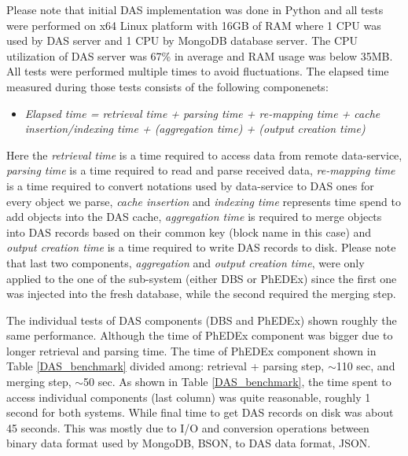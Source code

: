 \documentclass[1p,times]{elsarticle}
\begin{document}
Please note that initial DAS implementation was done in Python 
and all tests were performed on x64 Linux platform with 16GB of RAM where
1 CPU was used by DAS server and 1 CPU by MongoDB database server. The CPU utilization
of DAS server was 67\% in average and RAM usage was below 35MB. 
All tests were performed multiple times to avoid fluctuations. 
The elapsed time measured during those tests consists of the 
following componenets:
\begin{itemize}
\item[]
{\it
Elapsed time = retrieval time + parsing time + re-mapping time 
        + cache insertion/indexing time 
        + (aggregation time) + (output creation time)
}
\end{itemize}
Here the {\it retrieval time} is a time required to access data from remote data-service,
{\it parsing time} is a time required to read and parse received data, {\it re-mapping time}
is a time required to convert notations used by data-service to DAS ones for every object
we parse, {\it cache insertion} and {\it indexing time} represents time spend to add objects into
the DAS cache, {\it aggregation time} is required to merge objects into DAS records based
on their common key (block name in this case) and {\it output creation time}
is a time required to write DAS records to disk. Please note that last two
components, {\it aggregation} and {\it output creation time}, were only applied to
the one of the sub-system (either DBS or PhEDEx) since the first one was injected into
the fresh database, while the second required the merging step.

%

The individual tests of DAS components (DBS and PhEDEx) shown roughly 
the same performance. Although the time of PhEDEx component was bigger 
due to longer retrieval and parsing time.
The time of PhEDEx component shown in Table \ref{DAS_benchmark} divided 
among: retrieval + parsing step, $\sim$110 sec, and merging step, $\sim$50 sec.
As shown in Table \ref{DAS_benchmark},
the time spent to access individual components (last column) was quite
reasonable, roughly 1 second for both systems. While final time to
get DAS records on disk was about 45 seconds. This was mostly due to I/O and
conversion operations between binary data format used by MongoDB, BSON, to DAS
data format, JSON.
\end{document}

